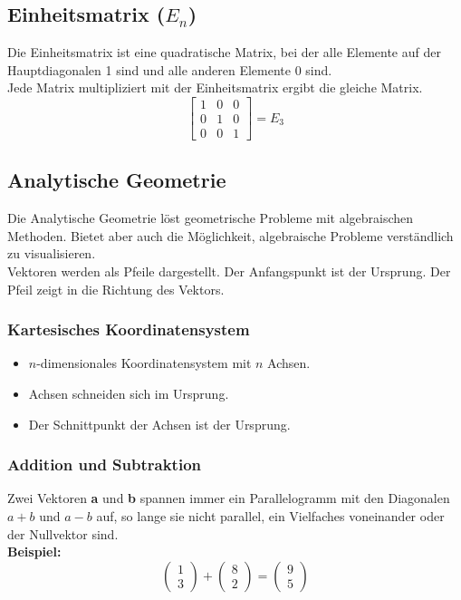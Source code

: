 \documentclass[12pt,a4paper]{article}
\begin{document}
\subsection{Einheitsmatrix ($E_n$)}
Die Einheitsmatrix ist eine quadratische Matrix, bei der alle Elemente auf der Hauptdiagonalen 1 sind und alle anderen Elemente 0 sind. \\ Jede Matrix multipliziert mit der Einheitsmatrix ergibt die gleiche Matrix. \\
\[
\begin{bmatrix}
1 & 0 & 0 \\
0 & 1 & 0 \\
0 & 0 & 1
\end{bmatrix}
= E_3
\]

\subsection{Analytische Geometrie}
Die Analytische Geometrie löst geometrische Probleme mit algebraischen Methoden. Bietet aber auch die Möglichkeit, algebraische Probleme verständlich zu visualisieren. \\

Vektoren werden als Pfeile dargestellt. Der Anfangspunkt ist der Ursprung. Der Pfeil zeigt in die Richtung des Vektors. \\

\subsubsection{Kartesisches Koordinatensystem}
\begin{itemize}
    \item $n$-dimensionales Koordinatensystem mit $n$ Achsen.
    \item Achsen schneiden sich im Ursprung.
    \item Der Schnittpunkt der Achsen ist der Ursprung.
\end{itemize}
\subsubsection{Addition und Subtraktion}
Zwei Vektoren \textbf{a} und \textbf{b} spannen immer ein Parallelogramm mit den Diagonalen \textbf{$a+b$} und \textbf{$a-b$} auf, so lange sie nicht parallel, ein Vielfaches voneinander oder der Nullvektor sind. \\

\textbf{Beispiel:}
\[
\begin{pmatrix}
1 \\
3
\end{pmatrix}
+
\begin{pmatrix}
8 \\
2
\end{pmatrix}
=
\begin{pmatrix}
9 \\
5
\end{pmatrix}
\]
\end{document}
